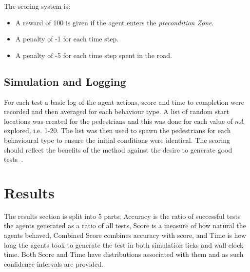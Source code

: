 \documentclass[letterpaper, 10 pt, journal, twoside]{IEEEtran}
\begin{document}
The scoring system is:
\begin{itemize}
  \item A reward of 100 is given if the agent enters the \textit{precondition Zone}.
  \item A penalty of -1 for each time step.
  \item A penalty of -5 for each time step spent in the road.
\end{itemize}


\subsection{Simulation and Logging}
For each test a basic log of the agent actions, score and time to completion were recorded and then averaged for each behaviour type. A list of random start locations was created for the pedestrians and this was done for each value of $nA$ explored, i.e. 1-20. The list was then used to spawn the pedestrians for each behavioural type to ensure the initial conditions were identical. 
%
The scoring should reflect the benefits of the method against the desire to generate good tests~\cite{fewster1999software}.








\section{Results}\label{s:results}
The results section is split into 5 parts; Accuracy is the ratio of successful tests the agents generated as a ratio of all tests, Score is a measure of how natural the agents behaved, Combined Score combines accuracy with score, and Time is how long the agents took to generate the test in both simulation ticks and wall clock time. Both Score and Time have distributions associated with them and as such confidence intervals are provided.
\end{document}
